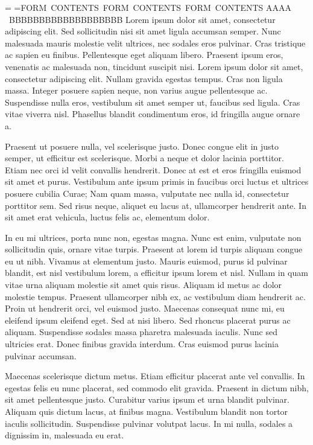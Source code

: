 \output={}
=\hbox{FORM CONTENTS FORM CONTENTS FORM CONTENTS}
\noindent
AAAA
\pdfrefxform
\pdflastxform
\ BBBBBBBBBBBBBBBBBBB
Lorem ipsum dolor sit amet, consectetur adipiscing elit. Sed sollicitudin nisi sit amet ligula accumsan semper. Nunc malesuada mauris molestie velit ultrices, nec sodales eros pulvinar. Cras tristique ac sapien eu finibus. Pellentesque eget aliquam libero. Praesent ipsum eros, venenatis ac malesuada non, tincidunt suscipit nisi. Lorem ipsum dolor sit amet, consectetur adipiscing elit. Nullam gravida egestas tempus. Cras non ligula massa. Integer posuere sapien neque, non varius augue pellentesque ac. Suspendisse nulla eros, vestibulum sit amet semper ut, faucibus sed ligula. Cras vitae viverra nisl. Phasellus blandit condimentum eros, id fringilla augue ornare a.

Praesent ut posuere nulla, vel scelerisque justo. Donec congue elit in justo semper, ut efficitur est scelerisque. Morbi a neque et dolor lacinia porttitor. Etiam nec orci id velit convallis hendrerit. Donec at est et eros fringilla euismod sit amet et purus. Vestibulum ante ipsum primis in faucibus orci luctus et ultrices posuere cubilia Curae; Nam quam massa, vulputate nec nulla id, consectetur porttitor sem. Sed risus neque, aliquet eu lacus at, ullamcorper hendrerit ante. In sit amet erat vehicula, luctus felis ac, elementum dolor.

In eu mi ultrices, porta nunc non, egestas magna. Nunc est enim, vulputate non sollicitudin quis, ornare vitae turpis. Praesent at lorem id turpis aliquam congue eu ut nibh. Vivamus at elementum justo. Mauris euismod, purus id pulvinar blandit, est nisl vestibulum lorem, a efficitur ipsum lorem et nisl. Nullam in quam vitae urna aliquam molestie sit amet quis risus. Aliquam id metus ac dolor molestie tempus. Praesent ullamcorper nibh ex, ac vestibulum diam hendrerit ac. Proin ut hendrerit orci, vel euismod justo. Maecenas consequat nunc mi, eu eleifend ipsum eleifend eget. Sed at nisi libero. Sed rhoncus placerat purus ac aliquam. Suspendisse sodales massa pharetra malesuada iaculis. Nunc sed ultricies erat. Donec finibus gravida interdum. Cras euismod purus lacinia pulvinar accumsan.

Maecenas scelerisque dictum metus. Etiam efficitur placerat ante vel convallis. In egestas felis eu nunc placerat, sed commodo elit gravida. Praesent in dictum nibh, sit amet pellentesque justo. Curabitur varius ipsum et urna blandit pulvinar. Aliquam quis dictum lacus, at finibus magna. Vestibulum blandit non tortor iaculis sollicitudin. Suspendisse pulvinar volutpat lacus. In mi nulla, sodales a dignissim in, malesuada eu erat.

